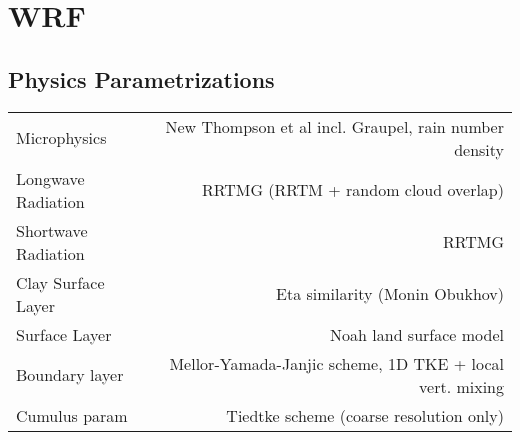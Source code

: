 \section{WRF}
\subsection{Physics Parametrizations}
\begin{tabular}{lr}
Microphysics       & New Thompson et al incl. Graupel, rain number density\\
Longwave Radiation & RRTMG (RRTM + random cloud overlap)\\
Shortwave Radiation& RRTMG\\
Clay Surface Layer & Eta similarity (Monin Obukhov)\\
Surface Layer      & Noah land surface model\\
Boundary layer     & Mellor-Yamada-Janjic scheme, 1D TKE + local vert. mixing\\
Cumulus param      & Tiedtke scheme (coarse resolution only)\\
\end{tabular}
